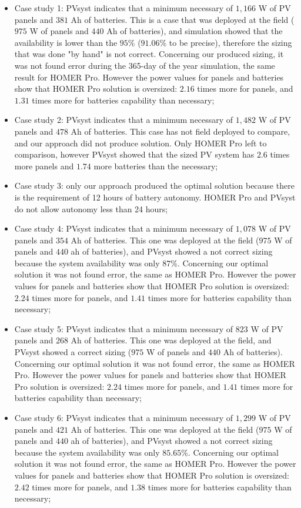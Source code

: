 \documentclass[runningheads]{llncs}
\begin{document}
\begin{itemize}
  	\item Case study 1: PVsyst indicates that a minimum necessary of $1,166$ W of PV panels and $381$ Ah of batteries. This is a case that was deployed at the field ($975$ W of panels and $440$ Ah of batteries), and simulation showed that the availability is lower than the $95$\% ($91.06$\% to be precise), therefore the sizing that was done "by hand" is not correct. Concerning our produced sizing, it was not found error during the 365-day of the year simulation, the same result for HOMER Pro. However the power values for panels and batteries show that HOMER Pro solution is oversized: $2.16$ times more for panels, and $1.31$ times more for batteries capability than necessary;
	\item Case study 2: PVsyst indicates that a minimum necessary of $1,482$ W of PV panels and $478$ Ah of batteries. This case has not field deployed to compare, and our approach did not produce solution. Only HOMER Pro left to comparison, however PVsyst showed that the sized PV system has $2.6$ times more panels and $1.74$ more batteries than the necessary;
	\item Case study 3: only our approach produced the optimal solution because there is the requirement of 12 hours of battery autonomy. HOMER Pro and PVsyst do not allow autonomy less than 24 hours;
	\item Case study 4: PVsyst indicates that a minimum necessary of $1,078$ W of PV panels and $354$ Ah of batteries. This one was deployed at the field ($975$ W of panels and $440$ ah of batteries), and PVsyst showed a not correct sizing because the system availability was only $87$\%. Concerning our optimal solution it was not found error, the same as HOMER Pro. However the power values for panels and batteries show that HOMER Pro solution is oversized: $2.24$ times more for panels, and $1.41$ times more for batteries capability than necessary;
	\item Case study 5: PVsyst indicates that a minimum necessary of $823$ W of PV panels and $268$ Ah of batteries. This one was deployed at the field, and PVsyst showed a correct sizing ($975$ W of panels and $440$ Ah of batteries). Concerning our optimal solution it was not found error, the same as HOMER Pro. However the power values for panels and batteries show that HOMER Pro solution is oversized: $2.24$ times more for panels, and $1.41$ times more for batteries capability than necessary;
	\item Case study 6: PVsyst indicates that a minimum necessary of $1,299$ W of PV panels and $421$ Ah of batteries. This one was deployed at the field ($975$ W of panels and $440$ ah of batteries), and PVsyst showed a not correct sizing because the system availability was only $85.65$\%. Concerning our optimal solution it was not found error, the same as HOMER Pro. However the power values for panels and batteries show that HOMER Pro solution is oversized: $2.42$ times more for panels, and $1.38$ times more for batteries capability than necessary;

\end{itemize}
\end{document}
